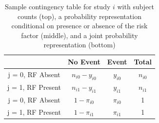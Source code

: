 \documentclass[AMA,STIX1COL]{WileyNJD-v2}
\begin{document}


\clearpage 


\begin{table}[ht]
\centering
\begin{tabular}{c|cc|c}
                           & No Event          & Event       & Total        \\ \hline
j = 0, RF Absent  & $n_{i0} - y_{i0}$ & $y_{i0}$    & $n_{i0}$     \\
j = 1, RF Present & $n_{i1} - y_{i1}$ & $y_{i1}$    & $n_{i1}$     \\ \hline
j = 0, RF Absent & $1 - \pi_{i0}$    & $\pi_{i0}$  & 1            \\
j = 1, RF Present & $1 - \pi_{i1}$    & $\pi_{i1}$  & 1            \\ \hline 
\end{tabular}
\caption{Sample contingency table for study $i$ with subject counts (top), a probability representation conditional on presence or absence of the risk factor (middle), and a joint probability representation (bottom)}
\label{table:RCT_contingency}
\end{table}

\clearpage
\end{document}
